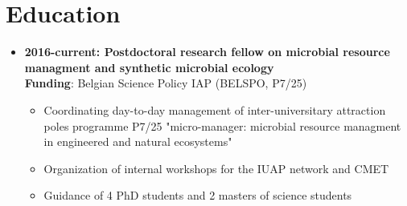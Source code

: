 \documentclass[a4paper,11pt,oneside]{article}
\begin{document}
\section*{Education}
\begin{itemize}
\item \textbf{2016-current: Postdoctoral research fellow on microbial resource managment and synthetic microbial ecology}\\
\textbf{Funding}: Belgian Science Policy IAP (BELSPO, P7/25)
    \begin{itemize}
      \item Coordinating day-to-day management of inter-universitary attraction poles programme P7/25 "micro-manager: microbial resource managment in engineered and natural ecosystems"
      \item Organization of internal workshops for the IUAP network and CMET
      \item Guidance of 4 PhD students and 2 masters of science students
    \end{itemize}


\end{itemize}
\end{document}
